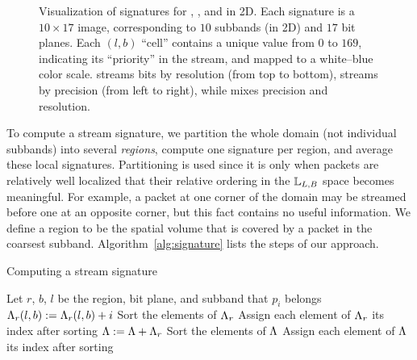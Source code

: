 \begin{figure}[!t]
\centering
\vspace{-0.5em}
\caption{Visualization of signatures for \slvl, \sbit, and \swav in 2D. Each signature is a
$10\times 17$ image, corresponding to $10$ subbands (in 2D) and $17$ bit planes. Each $(l,b)$
``cell'' contains a unique value from $0$ to $169$, indicating its ``priority'' in the stream, and
mapped to a white--blue color scale. \slvl streams bits by resolution (from top to bottom), \sbit
streams by precision (from left to right), while \swav mixes precision and resolution.}
\label{fig:example-signatures}
\vspace{-1.5em}
\end{figure}

To compute a stream signature, we partition the whole domain (not individual subbands) into several
\emph{regions}, compute one signature per region, and average these local signatures. Partitioning
is used since it is only when packets are relatively well localized that their relative ordering in
the ${\mathbb L}_{L,B}$ space becomes meaningful. For example, a packet at one corner of the domain may
be streamed before one at an opposite corner, but this fact contains no useful information. We
define a region to be the spatial volume that is covered by a packet in the coarsest subband.
Algorithm~\ref{alg:signature} lists the steps of our approach.

\begin{algorithm}[h]
  \caption{Computing a stream signature}
  \begin{algorithmic}[1]
			\State Let $r$, $b$, $l$ be the region, bit plane, and subband that $p_i$ belongs
			\State $\sgn_r(l,b) := \sgn_r(l,b)+i$
		\EndFor
			\State Sort the elements of $\sgn_r$
			\State Assign each element of $\sgn_r$ its index after sorting
			\State $\sgn := \sgn+\sgn_r$
		\EndFor
		\State Sort the elements of $\sgn$
		\State Assign each element of $\sgn$ its index after sorting
	\end{algorithmic}
	\label{alg:signature}
\end{algorithm}

